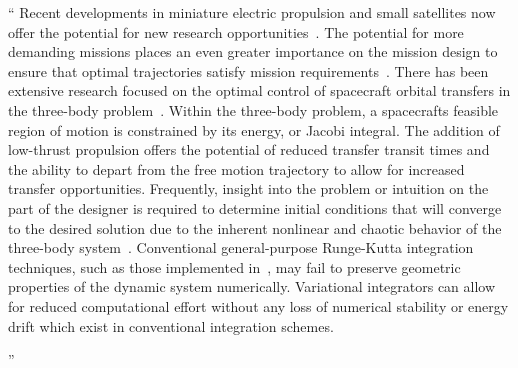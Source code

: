 \documentclass[11pt]{article}
\newenvironment{correction}{\begin{list}{}{\setlength{\leftmargin}{1cm}\setlength{\rightmargin}{1cm}}\vspace{\parsep}\item[]``}{''\end{list}}
\begin{document}
\begin{itemize}
\begin{correction}
            Recent developments in miniature electric propulsion and small satellites now offer the potential for new research opportunities~\cite{folta2015,haque2013}.
            The potential for more demanding missions places an even greater importance on the mission design to ensure that optimal trajectories satisfy mission requirements~\cite{folta2015,koon2011,ross2006,gomez2001}. 
            There has been extensive research focused on the optimal control of spacecraft orbital transfers in the three-body problem~\cite{mingotti2011,grebow2011,koon2011,ross2006}. 
            Within the three-body problem, a spacecrafts feasible region of motion is constrained by its energy, or Jacobi integral.
            The addition of low-thrust propulsion offers the potential of reduced transfer transit times and the ability to depart from the free motion trajectory to allow for increased transfer opportunities.
            Frequently, insight into the problem or intuition on the part of the designer is required to determine initial conditions that will converge to the desired solution due to the inherent nonlinear and chaotic behavior of the three-body system~\cite{szebehely1967}.
            Conventional general-purpose Runge-Kutta integration techniques, such as those implemented in~\cite{mingotti2011,grebow2011}, may fail to preserve geometric properties of the dynamic system numerically. 
            Variational integrators can allow for reduced computational effort without any loss of numerical stability or energy drift which exist in conventional integration schemes. 







\end{correction}
\end{itemize}
\end{document}
